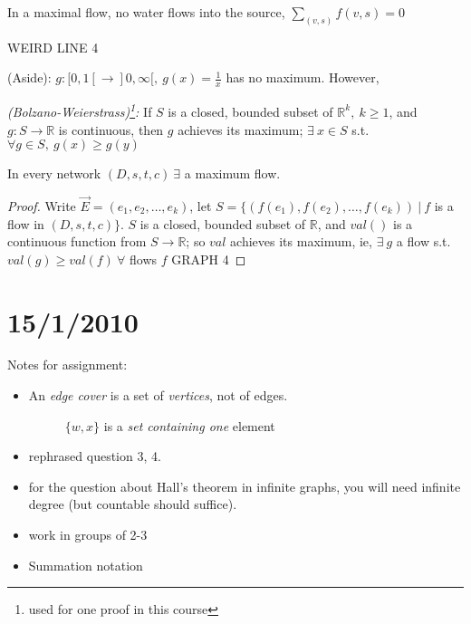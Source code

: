\documentclass{article}
\begin{document}
\begin{exer}
In a maximal flow, no water flows into the source, $\displaystyle\sum_{(v,s)}f(v,s) = 0$
\end{exer}

WEIRD LINE 4

(Aside): $g:[0,1[ \rightarrow ]0,\infty[, ~ g(x) = \frac{1}{x}$ has no maximum. However,

\begin{thm}
\emph{(Bolzano-Weierstrass)\footnote{used for one proof in this course}:} If $S$ is a closed, bounded subset of $\mathbb{R}^k, ~k\geq 1$, and $g:S\rightarrow \mathbb{R}$ is continuous, then $g$ achieves its maximum; $\exists ~x \in S$ s.t. $\forall g \in S,~ g(x)\geq g(y)$
\end{thm}

\begin{lem}
\label{network-maxflow}
In every network $(D,s,t,c)~ \exists$ a maximum flow.
\end{lem}

\begin{proof}
Write $\overrightarrow{E} = (e_1, e_2, \ldots, e_k)$, let $S = \{(f(e_1),f(e_2), \ldots, f(e_k))~|~f$ is a flow in $(D,s,t,c)\}$.  $S$ is a closed, bounded subset of $\mathbb{R}$, and $val()$ is a continuous function from $S \rightarrow \mathbb{R}$; so $val$ achieves its maximum, ie, $\exists ~g$ a flow s.t. $val(g) \geq val(f) ~ \forall$ flows $f$ GRAPH 4 
\end{proof}



\section*{15/1/2010}

Notes for assignment:
\begin{itemize}
 \item An \emph{edge cover} is a set of \emph{vertices}, not of edges. 

\begin{figure}[H]
\centering

\caption{{$\{w,x\}$} is a \emph{set containing one} element}
\end{figure}

\item rephrased question 3, 4.
\item for the question about Hall's theorem in infinite graphs, you will need infinite degree (but countable should suffice).
\item work in groups of 2-3
\item Summation notation
\end{itemize}
\end{document}
